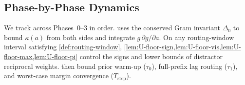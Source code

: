 \subsection{Phase-by-Phase Dynamics}
\label{app:J-geom-sub}
\label{app:J-constants}

We track \stepode{} across Phases~0--3 in order.  uses the conserved Gram invariant $\Delta_0$ to bound $\kappa(a)$ from both sides and integrate $g\,\partial g/\partial a$. On any routing-window interval satisfying \cref{def:routing-window}, \cref{lem:U-floor-sign,lem:U-floor-vis,lem:U-floor-max,lem:U-floor-pi} control the signs and lower bounds of distractor reciprocal weights.  then bound prior warm-up ($\tau_0$), full-prefix lag routing ($\tau_1$), and worst-case margin convergence ($T_{\mathrm{step}}$).

